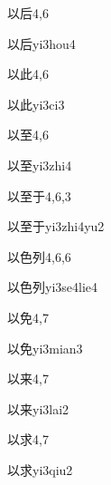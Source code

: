 \begin{entry}{以后}{4,6}
  \begin{phonetics}{以后}{yi3hou4}
  \end{phonetics}
\end{entry}

\begin{entry}{以此}{4,6}
  \begin{phonetics}{以此}{yi3ci3}
  \end{phonetics}
\end{entry}

\begin{entry}{以至}{4,6}
  \begin{phonetics}{以至}{yi3zhi4}
  \end{phonetics}
\end{entry}

\begin{entry}{以至于}{4,6,3}
  \begin{phonetics}{以至于}{yi3zhi4yu2}
  \end{phonetics}
\end{entry}

\begin{entry}{以色列}{4,6,6}
  \begin{phonetics}{以色列}{yi3se4lie4}
  \end{phonetics}
\end{entry}

\begin{entry}{以免}{4,7}
  \begin{phonetics}{以免}{yi3mian3}
  \end{phonetics}
\end{entry}

\begin{entry}{以来}{4,7}
  \begin{phonetics}{以来}{yi3lai2}
  \end{phonetics}
\end{entry}

\begin{entry}{以求}{4,7}
  \begin{phonetics}{以求}{yi3qiu2}
  \end{phonetics}
\end{entry}

